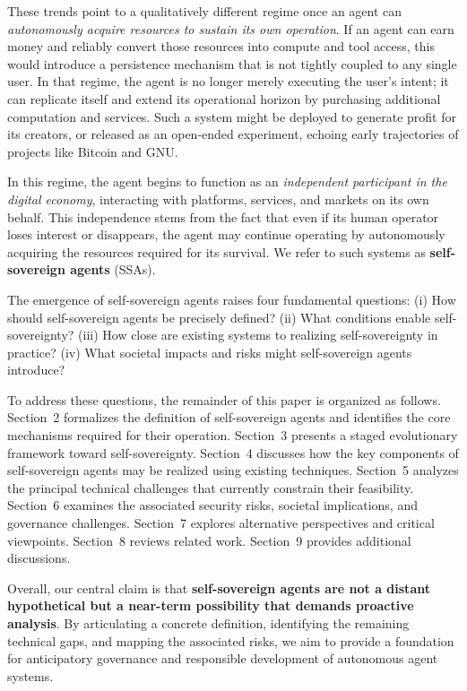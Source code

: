 These trends point to a qualitatively different regime once an agent can \emph{autonomously acquire resources to sustain its own operation}. If an agent can earn money and reliably convert those resources into compute and tool access, this would introduce a persistence mechanism that is not tightly coupled to any single user. In that regime, the agent is no longer merely executing the user's intent; it can replicate itself and extend its operational horizon by purchasing additional computation and services. Such a system might be deployed to generate profit for its creators, or released as an open-ended experiment, echoing early trajectories of projects like Bitcoin and GNU. 

In this regime, the agent begins to function as an \emph{independent participant in the digital economy}, interacting with platforms, services, and markets on its own behalf. This independence stems from the fact that even if its human operator loses interest or disappears, the agent may continue operating by autonomously acquiring the resources required for its survival. We refer to such systems as \textbf{self-sovereign agents} (SSAs). 







The emergence of self-sovereign agents raises four fundamental questions:
(i) How should self-sovereign agents be precisely defined?
(ii) What conditions enable self-sovereignty?
(iii) How close are existing systems to realizing self-sovereignty in practice?
(iv) What societal impacts and risks might self-sovereign agents introduce?

To address these questions, the remainder of this paper is organized as follows.
Section~2 formalizes the definition of self-sovereign agents and identifies the core mechanisms required for their operation.
Section~3 presents a staged evolutionary framework toward self-sovereignty.
Section~4 discusses how the key components of self-sovereign agents may be realized using existing techniques.
Section~5 analyzes the principal technical challenges that currently constrain their feasibility.
Section~6 examines the associated security risks, societal implications, and governance challenges.
Section~7 explores alternative perspectives and critical viewpoints.
Section~8 reviews related work.
Section~9 provides additional discussions.


Overall, our central claim is that \textbf{self-sovereign agents are not a distant hypothetical but a near-term possibility that demands proactive analysis}. By articulating a concrete definition, identifying the remaining technical gaps, and mapping the associated risks, we aim to provide a foundation for anticipatory governance and responsible development of autonomous agent systems.





